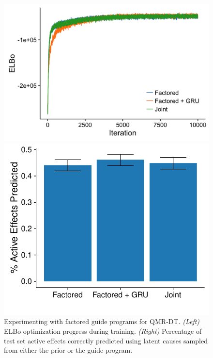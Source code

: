\begin{figure}[!ht]
\begin{minipage}{0.5\linewidth}
\centering
\includegraphics[width=\linewidth]{figs/results/qmr/elboProgress_factored.png}
\end{minipage}
%
\begin{minipage}{0.5\linewidth}
\centering
\includegraphics[width=\linewidth]{figs/results/qmr/reconstructScores_factored.pdf}
\end{minipage}
\caption{Experimenting with factored guide programs for QMR-DT. \emph{(Left)} ELBo optimization progress during training. \emph{(Right)} Percentage of test set active effects correctly predicted using latent causes sampled from either the prior or the guide program.}
\label{fig:qmrResults_factored}
\end{figure}


